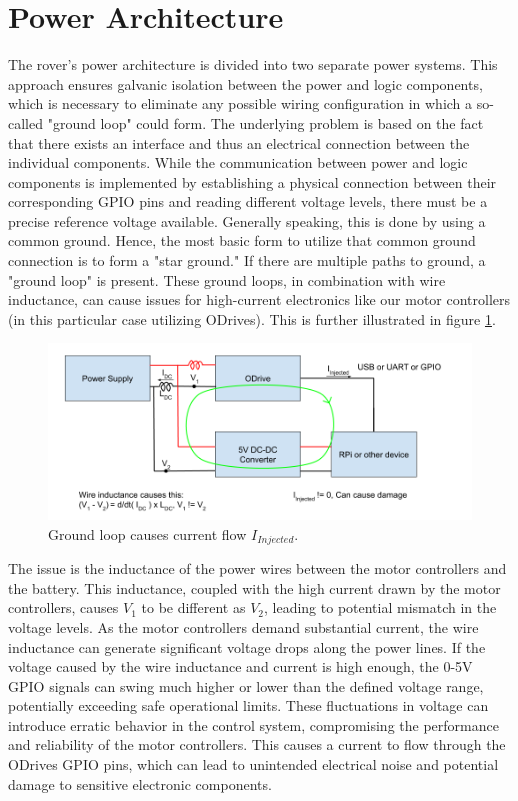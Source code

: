     \clearpage      
\section{Power Architecture}

    The rover's power architecture is divided into two separate power systems. This approach ensures galvanic isolation between the power and logic components, which is necessary to eliminate any possible wiring configuration in which a so-called "ground loop" could form. The underlying problem is based on the fact that there exists an interface and thus an electrical connection between the individual components. While the communication between power and logic components is implemented by establishing a physical connection between their corresponding GPIO pins and reading different voltage levels, there must be a precise reference voltage available. Generally speaking, this is done by using a common ground. Hence, the most basic form to utilize that common ground connection is to form a "star ground." If there are multiple paths to ground, a "ground loop" is present. These ground loops, in combination with wire inductance, can cause issues for high-current electronics like our motor controllers (in this particular case utilizing ODrives). This is further illustrated in figure \ref{ground_loop_bad}.
    
    \begin{figure}[h]
    \includegraphics[width=\textwidth]{contents/figures/ground_loop_bad.png}
    \caption{Ground loop causes current flow $I_{Injected}$.}
    \label{ground_loop_bad}
    \end{figure}
    
    The issue is the inductance of the power wires between the motor controllers and the battery. This inductance, coupled with the high current drawn by the motor controllers, causes $V_1$ to be different as $V_2$, leading to potential mismatch in the voltage levels. As the motor controllers demand substantial current, the wire inductance can generate significant voltage drops along the power lines. If the voltage caused by the wire inductance and current is high enough, the 0-5V GPIO signals can swing much higher or lower than the defined voltage range, potentially exceeding safe operational limits. These fluctuations in voltage can introduce erratic behavior in the control system, compromising the performance and reliability of the motor controllers. This causes a current to flow through the ODrives GPIO pins, which can lead to unintended electrical noise and potential damage to sensitive electronic components.

